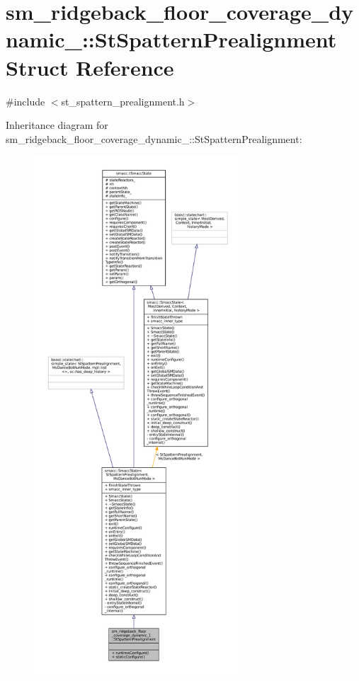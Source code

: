 \hypertarget{structsm__ridgeback__floor__coverage__dynamic__1_1_1StSpatternPrealignment}{}\section{sm\+\_\+ridgeback\+\_\+floor\+\_\+coverage\+\_\+dynamic\+\_\+:\+:St\+Spattern\+Prealignment Struct Reference}
\label{structsm__ridgeback__floor__coverage__dynamic__1_1_1StSpatternPrealignment}


{\ttfamily \#include $<$st\+\_\+spattern\+\_\+prealignment.\+h$>$}



Inheritance diagram for sm\+\_\+ridgeback\+\_\+floor\+\_\+coverage\+\_\+dynamic\+\_\+:\+:St\+Spattern\+Prealignment\+:
\nopagebreak
\begin{figure}[H]
\begin{center}
\leavevmode
\includegraphics[height=550pt]{structsm__ridgeback__floor__coverage__dynamic__1_1_1StSpatternPrealignment__inherit__graph}
\end{center}
\end{figure}


